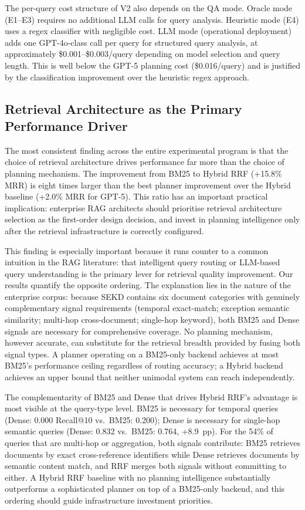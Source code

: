 \documentclass[11pt, a4paper]{article}
\begin{document}
The per-query cost structure of V2 also depends on the QA mode. Oracle mode (E1--E3) requires no additional LLM calls for query analysis. Heuristic mode (E4) uses a regex classifier with negligible cost. LLM mode (operational deployment) adds one GPT-4o-class call per query for structured query analysis, at approximately \$0.001--\$0.003/query depending on model selection and query length. This is well below the GPT-5 planning cost (\$0.016/query) and is justified by the classification improvement over the heuristic regex approach.

\subsection{Retrieval Architecture as the Primary Performance Driver}

The most consistent finding across the entire experimental program is that the choice of retrieval architecture drives performance far more than the choice of planning mechanism. The improvement from BM25 to Hybrid RRF (+15.8\% MRR) is eight times larger than the best planner improvement over the Hybrid baseline (+2.0\% MRR for GPT-5). This ratio has an important practical implication: enterprise RAG architects should prioritise retrieval architecture selection as the first-order design decision, and invest in planning intelligence only after the retrieval infrastructure is correctly configured.

This finding is especially important because it runs counter to a common intuition in the RAG literature: that intelligent query routing or LLM-based query understanding is the primary lever for retrieval quality improvement. Our results quantify the opposite ordering. The explanation lies in the nature of the enterprise corpus: because SEKD contains six document categories with genuinely complementary signal requirements (temporal exact-match; exception semantic similarity; multi-hop cross-document; single-hop keyword), both BM25 and Dense signals are necessary for comprehensive coverage. No planning mechanism, however accurate, can substitute for the retrieval breadth provided by fusing both signal types. A planner operating on a BM25-only backend achieves at most BM25's performance ceiling regardless of routing accuracy; a Hybrid backend achieves an upper bound that neither unimodal system can reach independently.

The complementarity of BM25 and Dense that drives Hybrid RRF's advantage is most visible at the query-type level. BM25 is necessary for temporal queries (Dense: 0.000 Recall@10 vs.\ BM25: 0.200); Dense is necessary for single-hop semantic queries (Dense: 0.832 vs.\ BM25: 0.764, +8.9~pp). For the 54\% of queries that are multi-hop or aggregation, both signals contribute: BM25 retrieves documents by exact cross-reference identifiers while Dense retrieves documents by semantic content match, and RRF merges both signals without committing to either. A Hybrid RRF baseline with no planning intelligence substantially outperforms a sophisticated planner on top of a BM25-only backend, and this ordering should guide infrastructure investment priorities.
\end{document}
